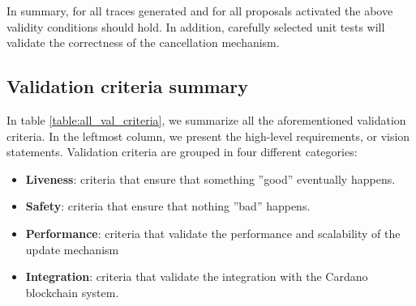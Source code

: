 In summary, for all traces generated and for all proposals
activated the above validity conditions should hold. In addition, carefully 
selected unit tests will validate the correctness of the cancellation mechanism.

\subsection{Validation criteria summary}\label{sec:val_criteria_summary}
In table \ref{table:all_val_criteria}, we summarize all the aforementioned 
validation criteria. In the leftmost column, we present the high-level 
requirements, or vision statements. Validation criteria are grouped in four 
different categories:
\begin{itemize}
	\item \textbf{Liveness}: criteria that ensure that something 
	''good'' eventually happens.
	\item \textbf{Safety}: criteria that ensure that nothing 
	''bad'' happens.
	\item \textbf{Performance}: criteria that validate the performance and 
	scalability of the update mechanism
	\item \textbf{Integration}: criteria that validate the integration with the 
	Cardano blockchain system.
\end{itemize}


\begin{center}
	\tablelasttail{\hline}
	\label{table:all_val_criteria}	
\end{center}

